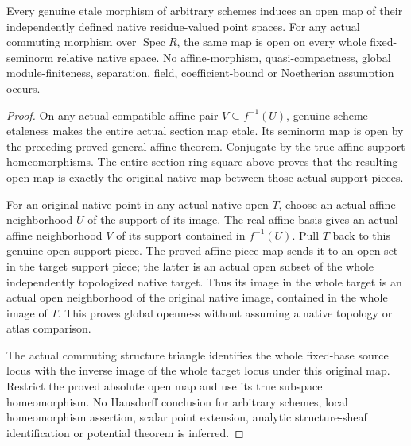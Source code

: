 \begin{theorem}
\label{scheme:actual-general-etale-native-open-map}
\leanok
{}
Every genuine etale morphism of arbitrary schemes induces an open map
of their independently defined native residue-valued point spaces.
For any actual commuting morphism over $\operatorname{Spec}R$, the
same map is open on every whole fixed-seminorm relative native space.
No affine-morphism, quasi-compactness, global module-finiteness,
separation, field, coefficient-bound or Noetherian assumption occurs.
\end{theorem}
\begin{proof}
On any actual compatible affine pair $V\subseteq f^{-1}(U)$, genuine
scheme etaleness makes the entire actual section map etale. Its
seminorm map is open by the preceding proved general affine theorem.
Conjugate by the true affine support homeomorphisms. The entire
section-ring square above proves that the resulting open map is
exactly the original native map between those actual support pieces.

For an original native point in any actual native open $T$, choose
an actual affine neighborhood $U$ of the support of its image. The
real affine basis gives an actual affine neighborhood $V$ of its
support contained in $f^{-1}(U)$. Pull $T$ back to this genuine open
support piece. The proved affine-piece map sends it to an open set in
the target support piece; the latter is an actual open subset of the
whole independently topologized native target. Thus its image in the
whole target is an actual open neighborhood of the original native
image, contained in the whole image of $T$. This proves global
openness without assuming a native topology or atlas comparison.

The actual commuting structure triangle identifies the whole
fixed-base source locus with the inverse image of the whole target
locus under this original map. Restrict the proved absolute open map
and use its true subspace homeomorphism. No Hausdorff conclusion for
arbitrary schemes, local homeomorphism assertion, scalar point
extension, analytic structure-sheaf identification or potential
theorem is inferred.
\end{proof}
